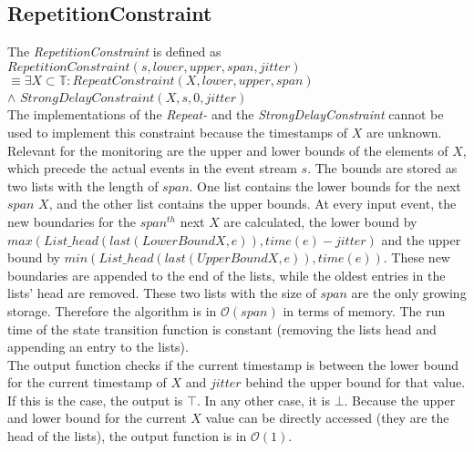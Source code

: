 \subsection{RepetitionConstraint}
	The  \emph{RepetitionConstraint} is defined as\\[10pt]
		$RepetitionConstraint(s, lower, upper, span, jitter)$\\
		$\equiv \exists X\subset \mathbb{T}: RepeatConstraint (X, lower, upper, span)$\\
		\hspace{7cm}$\land$ $StrongDelayConstraint(X, s, 0, jitter)$\\[10pt]
	The implementations of the \emph{Repeat-} and the \emph{StrongDelayConstraint} cannot be used to implement this constraint because the timestamps of $X$ are unknown.\\
	Relevant for the monitoring are the upper and lower bounds of the elements of $X$, which precede the actual events in the event stream $s$. The bounds are stored as two lists with the length of $span$. One list contains the lower bounds for the next $span$ $X$, and the other list contains the upper bounds. At every input event, the new boundaries for the $span^{th}$ next $X$ are calculated, the lower bound by $max(List\_head(last(LowerBoundX, e)), time(e)-jitter)$ and the upper bound by $min(List\_head(last(UpperBoundX, e)), time(e))$. These new boundaries are appended to the end of the lists, while the oldest entries in the lists' head are removed. These two lists with the size of $span$ are the only growing storage. Therefore the algorithm is in $\mathcal{O}(span)$ in terms of memory. The run time of the state transition function is constant (removing the lists head and appending an entry to the lists).\\
	The output function checks if the current timestamp is between the lower bound for the current timestamp of $X$ and $jitter$ behind the upper bound for that value. If this is the case, the output is $\top$. In any other case, it is $\bot$. Because the upper and lower bound for the current $X$ value can be directly accessed (they are the head of the lists), the output function is in $\mathcal{O}(1)$.
	
